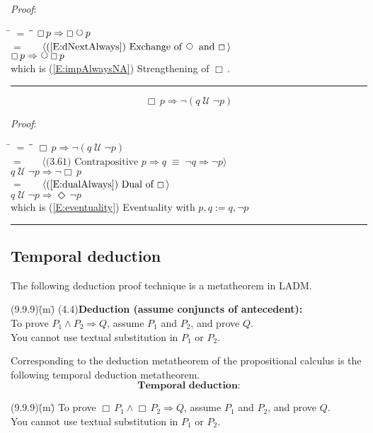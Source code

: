 \documentclass[12pt, fleqn, leqno]{article}
\newcommand{\lgap}{2pt}                             %
\newcommand{\mymathindent}{24pt}                    %
\newcommand{\equivs}{\ensuremath{\;\equiv\;}}       %
\newcommand{\impl}{\ensuremath{\Rightarrow}}        %
\newcommand{\Until}{\;\mathcal{U}\;}
\newcommand{\Next}{\;\,\text{\raisebox{3.5pt}{\circle{6}}}}
\newcommand{\Event}{\Diamond\,}
\newcommand{\Always}{\Box\,}
\newcommand{\myqed}{\rule[-.23ex]{1.2ex}{2.0ex}}
\newcommand{\myqedtab}{\hspace{384pt}}              %
\newcommand{\Gll} {\langle}                         %
\newcommand{\Ggg} {\rangle}                         %
\newcommand{\Hint}[1]     {\ \ \ $\Gll              \mbox{#1} \Ggg$ }   %
\begin{document}
\emph{Proof}:
\begin{tabbing}
\hspace{\mymathindent} \= $= \;$ \= \myqedtab \= \kill
  \> \>   $\Always p \impl \Always\Next p$\\[\lgap]
  \> $=$  \>  \Hint{(\ref{E:dNextAlways}) Exchange of $\Next$ and $\Always$}\\[\lgap]
  \> \>   $\Always p \impl \Next \Always p$\\[\lgap]
  \> which is (\ref{E:impAlwaysNA}) Strengthening of $\Always$. \quad \myqed
\end{tabbing}
\begin{equation}\label{E:impAlwaysNotUntil}
\Always p \impl \neg(q\Until \neg p)
\end{equation}

\emph{Proof}:
\begin{tabbing}
\hspace{\mymathindent} \= $= \;$ \= \myqedtab \= \kill
  \> \>   $\Always p \impl \neg(q\Until \neg p)$\\[\lgap]
  \> $=$  \>  \Hint{(3.61) Contrapositive $p\impl q \equivs \neg q\impl \neg p$}\\[\lgap]
  \> \>   $q\Until \neg p \impl \neg \Always p$\\[\lgap]
  \> $=$  \>  \Hint{(\ref{E:dualAlways}) Dual of $\Always$}\\[\lgap]
  \> \>   $q\Until \neg p \impl \Event\neg p$\\[\lgap]
  \> which is (\ref{E:eventuality}) Eventuality with $p,q:=q,\neg p$\quad \myqed
\end{tabbing}

\subsection{Temporal deduction}

The following deduction proof technique is a metatheorem in LADM.
\begin{tabbing}
(9.9.9)\;\=(m)\;\=\kill
(4.4)\>\textbf{Deduction (assume conjuncts of antecedent):}\\[\lgap]
      \>To prove $P_{1}\land P_{2}\impl Q$, assume $P_{1}$ and $P_{2}$, and prove $Q$.\\[\lgap]
      \>You cannot use textual substitution in $P_{1}$ or $P_{2}$.
\end{tabbing}
Corresponding to the deduction metatheorem of the propositional calculus is the following temporal deduction metatheorem.
\begin{equation}\label{E:metaDeduction}
\textbf{Temporal deduction:}
\end{equation}
\begin{tabbing}
(9.9.9)\;\=(m)\;\=\kill
      \>To prove $\Always P_{1}\land \Always P_{2}\impl Q$, assume $P_{1}$ and $P_{2}$, and prove $Q$.\\[\lgap]
      \>You cannot use textual substitution in $P_{1}$ or $P_{2}$.
\end{tabbing}
\end{document}
